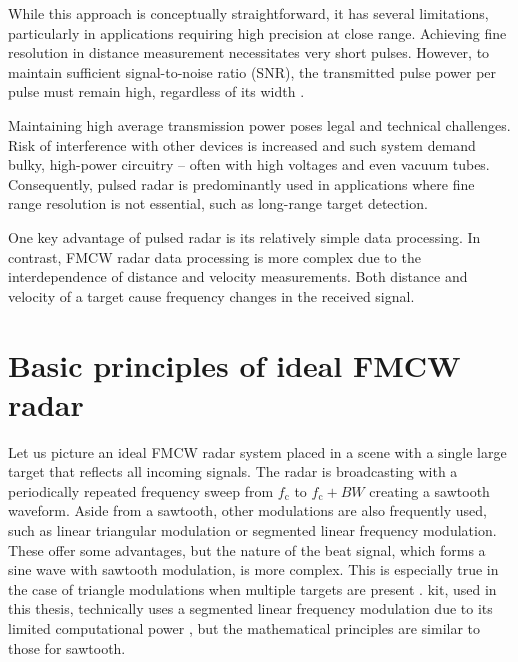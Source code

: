 While this approach is conceptually straightforward, it has several limitations, particularly in applications requiring high precision at close range.
Achieving fine resolution in distance measurement necessitates very short pulses.
However, to maintain sufficient signal-to-noise ratio (SNR), the transmitted pulse power per pulse must remain high, regardless of its width \cite{jankiraman2018}.

Maintaining high average transmission power poses legal and technical challenges.
Risk of interference with other devices is increased and such system demand bulky, high-power circuitry -- often with high voltages and even vacuum tubes.
Consequently, pulsed radar is predominantly used in applications where fine range resolution is not essential, such as long-range target detection.

One key advantage of pulsed radar is its relatively simple data processing.
In contrast, FMCW radar data processing is more complex due to the interdependence of distance and velocity measurements.
Both distance and velocity of a target cause frequency changes in the received signal.

\section{Basic principles of ideal FMCW radar}

Let us picture an ideal FMCW radar system placed in a scene with a single large target that reflects all incoming signals.
The radar is broadcasting with a periodically repeated frequency sweep from $f_\mathrm{c}$ to $f_\mathrm{c}+BW$ creating a sawtooth waveform.
Aside from a sawtooth, other modulations are also frequently used, such as linear triangular modulation or segmented linear frequency modulation.
These offer some advantages, but the nature of the beat signal, which forms a sine wave with sawtooth modulation, is more complex.
This is especially true in the case of triangle modulations when multiple targets are present \cite{jankiraman2018}.
\sidar kit, used in this thesis, technically uses a segmented linear frequency modulation due to its limited computational power \cite{sidarPRO}, but the mathematical principles are similar to those for sawtooth.

